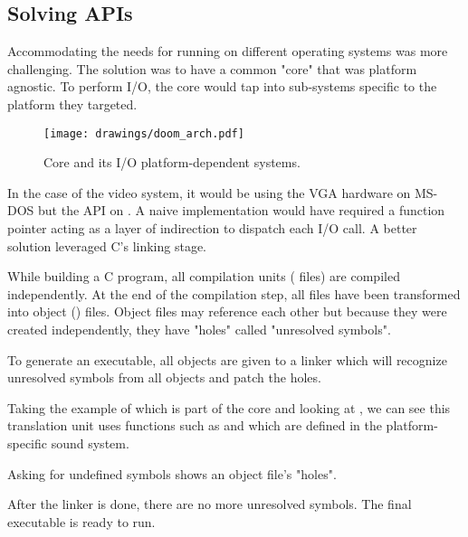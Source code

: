 \subsection{Solving APIs}
Accommodating the needs for running on different operating systems was more challenging. The solution was to have a common "core" that was platform agnostic. To perform I/O, the core would tap into sub-systems specific to the platform they targeted.\\
\par
\begin{figure}[H]
\centering
\texttt{[image: drawings/doom\_arch.pdf]}
\caption{\doom{} Core and its I/O platform-dependent systems.}
\end{figure}
\par
In the case of the video system, it would be using the VGA hardware on MS-DOS but the  API on \NeXT. A naive implementation would have required a function pointer acting as a layer of indirection to dispatch each I/O call. A better solution leveraged C's linking stage.\\
\par
 While building a C program, all compilation units ( files) are compiled independently. At the end of the compilation step, all  files have been transformed into object () files. Object files may reference each other but because they were created independently, they have "holes" called "unresolved symbols".\\
\par
 To generate an executable, all objects are given to a linker which will recognize unresolved symbols from all objects and patch the holes.\\
 \par
 Taking the example of  which is part of the core and looking at , we can see this translation unit uses functions such as  and  which are defined in the platform-specific sound system. 






 Asking  for undefined symbols shows an object file's "holes".\\
 \par
{}
\par
After the linker is done, there are no more unresolved symbols. The final executable is ready to run.\\
\par
{}




